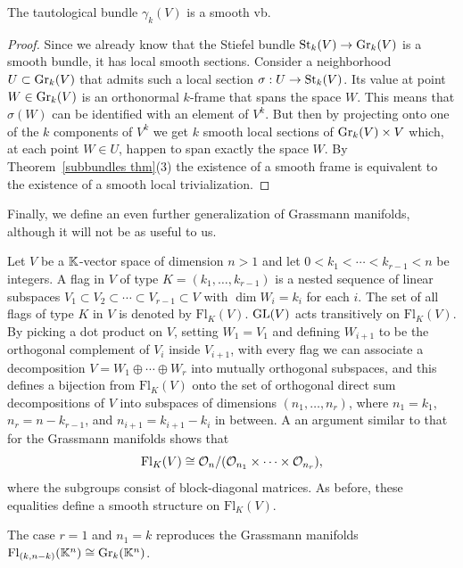 \begin{prop}
    The tautological bundle $\gamma_k(V)$ is a smooth \gls{vb}.
\end{prop}
\begin{proof}
    Since we already know that the Stiefel bundle $\operatorname{St}_k(V)\to \operatorname{Gr}_k(V)$ is a smooth bundle, it has local smooth sections. Consider a neighborhood $U\subset \operatorname{Gr}_k(V)$ that admits such a local section $\sigma:U\to \operatorname{St}_k(V)$. Its value at point $W\in \operatorname{Gr}_k(V)$ is an orthonormal $k$-frame that spans the space $W$. This means that $\sigma(W)$ can be identified with an element of $V^k$. But then by projecting onto one of the $k$ components of $V^k$ we get $k$ smooth local sections of $\operatorname{Gr}_k(V)\times V$ which, at each point $W\in U$, happen to span exactly the space $W$. By Theorem~\ref{subbundles thm}(3) the existence of a smooth frame is equivalent to the existence of a smooth local trivialization.
\end{proof}

Finally, we define an even further generalization of Grassmann manifolds, although it will not be as useful to us.

\begin{defn}
    Let $V$ be a $\mathbb{K}$-vector space of dimension $n>1$ and let $0<k_1<\cdots<k_{r-1}<n$ be integers. A flag in $V$ of type $K=(k_1,\ldots,k_{r-1})$ is a nested sequence of linear subspaces $V_1\subset V_2\subset \cdots \subset V_{r-1}\subset V$ with $\dim W_i=k_i$ for each $i$. The set of all flags of type $K$ in $V$ is denoted by $\mathrm{Fl}_K(V)$. $\operatorname{GL}(V)$ acts transitively on $\mathrm{Fl}_K(V)$. By picking a dot product on $V$, setting $W_1=V_1$ and defining $W_{i+1}$ to be the orthogonal complement of $V_i$ inside $V_{i+1}$, with every flag we can associate a decomposition $V=W_1\oplus \cdots\oplus W_r$ into mutually orthogonal subspaces, and this defines a bijection from $\mathrm{Fl}_K(V)$ onto the set of orthogonal direct sum decompositions of $V$ into subspaces of dimensions $(n_1,\ldots,n_r)$, where $n_1=k_1$, $n_r=n-k_{r-1}$, and $n_{i+1}=k_{i+1}-k_i$ in between. A an argument similar to that for the Grassmann manifolds shows that
    \[\mathrm{Fl}_K(V)\cong \mathcal{O}_n\slash (\mathcal{O}_{n_1}\times\cdots\times\mathcal{O}_{n_r}),\]
    where the subgroups consist of block-diagonal matrices. As before, these equalities define a smooth structure on $\mathrm{Fl}_K(V)$.
\end{defn}

The case $r=1$ and $n_1=k$ reproduces the Grassmann manifolds $\mathrm{Fl}_{(k,n-k)}(\mathbb{K}^n)\cong \operatorname{Gr}_k(\mathbb{K}^n)$.






